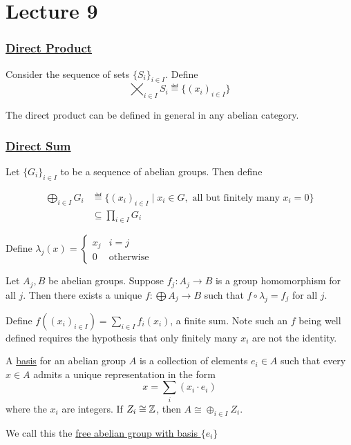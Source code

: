 \documentclass[x11names,reqno,14pt]{extarticle}
\begin{document}
\section*{Lecture 9}

\subsubsection*{\underline{Direct Product}}

Consider the sequence of sets $\{S_i\}_{i\in I}$. Define
\[
\bigtimes_{i\in I}S_i \eqdef \{(x_i)_{i\in I}\}
\]

The direct product can be defined in general in any abelian category. 

\subsubsection*{\underline{Direct Sum}}

Let $\{G_i\}_{i\in I}$ to be a sequence of abelian groups. Then define

\begin{align*}
\bigoplus_{i\in I}G_i & \eqdef \{(x_i)_{i\in I} \mid x_i \in G, \text{ all but finitely many }x_i = 0\} \\
							  & \subseteq \prod_{i\in I}G_i
\end{align*}

Define $\lambda_j(x) = \begin{cases} x_j & i = j \\ 0 & \text{otherwise} \end{cases}$

\prop

Let $A_j, B$ be abelian groups. Suppose $f_j:A_j\to B$ is a group homomorphism for all $j$. Then there exists a unique $f:\bigoplus A_j \to B$ such that $f \circ \lambda_j = f_j$ for all $j$.

\proof

Define $f((x_i)_{i\in I}) = \sum_{i\in I}f_i(x_i)$, a finite sum. Note such an $f$ being well defined requires the hypothesis that only finitely many $x_i$ are not the identity. 


A \underline{basis} for an abelian group $A$ is a collection of elements $e_i \in A$ such that every $x \in A$ admits a unique representation in the form 
\[
x = \sum_{i}(x_i \cdot e_i)
\]
where the $x_i$ are integers. If $Z_i \cong \mathbb{Z}$, then $A \cong \oplus_{i \in I}Z_i$. 

We call this the \underline{free abelian group with basis $\{e_i\}$}
\end{document}
